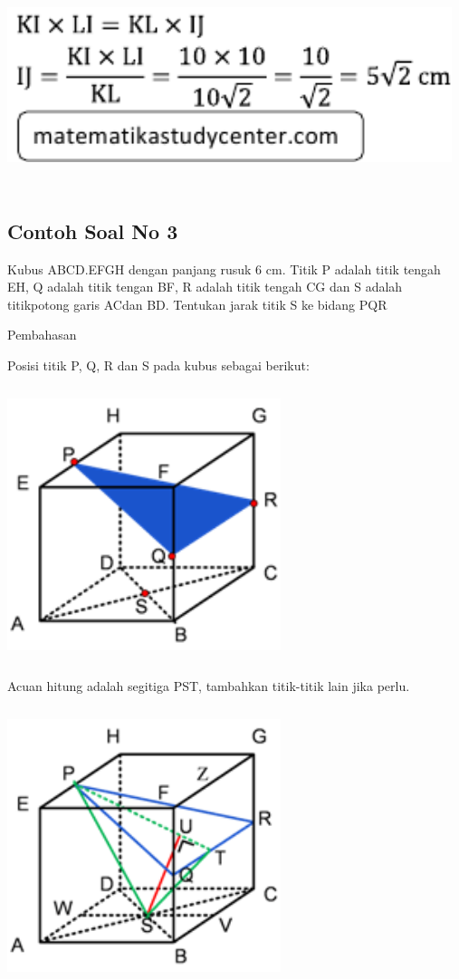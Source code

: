 \documentclass[11pt,fleqn]{book} %
\begin{document}
	\includegraphics[width = 13cm, height= 6cm]{Pictures/dede16.png}
	
	\subsection{Contoh Soal No 3}
	
	Kubus ABCD.EFGH dengan panjang rusuk 6 cm. Titik P adalah titik tengah EH, Q adalah titik tengan BF, R adalah titik tengah CG dan S adalah titikpotong garis ACdan BD. Tentukan jarak titik S ke bidang PQR

	Pembahasan

	Posisi titik P, Q, R dan S pada kubus sebagai berikut: 
	
	\includegraphics[width = 8cm, height= 8cm]{Pictures/dede17.png}
	
	Acuan hitung adalah segitiga PST, tambahkan titik-titik lain jika perlu. 
	
	\includegraphics[width = 8cm, height= 8cm]{Pictures/dede18.png}
	
\end{document}
